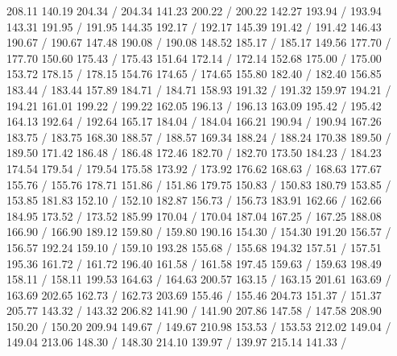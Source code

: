 { 208.11 140.19 204.34 /
 204.34 141.23 200.22 /
 200.22 142.27 193.94 /
 193.94 143.31 191.95 /
 191.95 144.35 192.17 /
 192.17 145.39 191.42 /
 191.42 146.43 190.67 /
 190.67 147.48 190.08 /
 190.08 148.52 185.17 /
 185.17 149.56 177.70 /
 177.70 150.60 175.43 /
 175.43 151.64 172.14 /
 172.14 152.68 175.00 /
 175.00 153.72 178.15 /
 178.15 154.76 174.65 /
 174.65 155.80 182.40 /
 182.40 156.85 183.44 /
 183.44 157.89 184.71 /
 184.71 158.93 191.32 /
 191.32 159.97 194.21 /
 194.21 161.01 199.22 /
 199.22 162.05 196.13 /
 196.13 163.09 195.42 /
 195.42 164.13 192.64 /
 192.64 165.17 184.04 /
 184.04 166.21 190.94 /
 190.94 167.26 183.75 /
 183.75 168.30 188.57 /
 188.57 169.34 188.24 /
 188.24 170.38 189.50 /
 189.50 171.42 186.48 /
 186.48 172.46 182.70 /
 182.70 173.50 184.23 /
 184.23 174.54 179.54 /
 179.54 175.58 173.92 /
 173.92 176.62 168.63 /
 168.63 177.67 155.76 /
 155.76 178.71 151.86 /
 151.86 179.75 150.83 /
 150.83 180.79 153.85 /
 153.85 181.83 152.10 /
 152.10 182.87 156.73 /
 156.73 183.91 162.66 /
 162.66 184.95 173.52 /
 173.52 185.99 170.04 /
 170.04 187.04 167.25 /
 167.25 188.08 166.90 /
 166.90 189.12 159.80 /
 159.80 190.16 154.30 /
 154.30 191.20 156.57 /
 156.57 192.24 159.10 /
 159.10 193.28 155.68 /
 155.68 194.32 157.51 /
 157.51 195.36 161.72 /
 161.72 196.40 161.58 /
 161.58 197.45 159.63 /
 159.63 198.49 158.11 /
 158.11 199.53 164.63 /
 164.63 200.57 163.15 /
 163.15 201.61 163.69 /
 163.69 202.65 162.73 /
 162.73 203.69 155.46 /
 155.46 204.73 151.37 /
 151.37 205.77 143.32 /
 143.32 206.82 141.90 /
 141.90 207.86 147.58 /
 147.58 208.90 150.20 /
 150.20 209.94 149.67 /
 149.67 210.98 153.53 /
 153.53 212.02 149.04 /
 149.04 213.06 148.30 /
 148.30 214.10 139.97 /
 139.97 215.14 141.33 /
}
